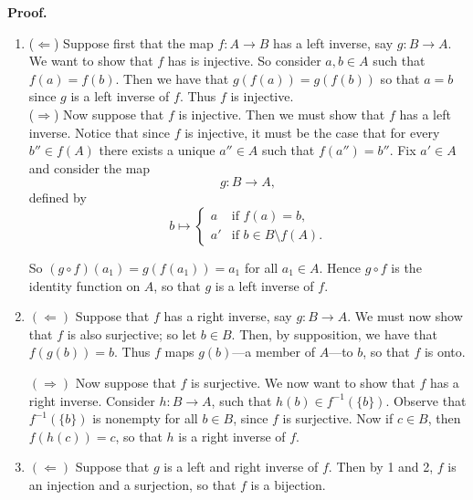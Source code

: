 \begin{enumerate}
      \textbf{Proof.}
      \begin{enumerate}
         \item ($\Leftarrow$) Suppose first that the map $f : A \rightarrow B$ 
               has a left inverse, say $g : B \rightarrow A$. We want to show 
               that $f$ has is injective. So consider $a, b \in A$ such that
               $f(a) = f(b)$. Then we have that $g(f(a)) = g(f(b))$ so that
               $a = b$ since $g$ is a left inverse of $f$. Thus $f$ is
               injective. \\
               ($\Rightarrow$) Now suppose that $f$ is injective. Then we must 
               show that $f$ has	a left inverse. Notice that since $f$ is 
               injective, it must be the case that for every $b'' \in f(A)$ 
               there exists a unique $a'' \in A$ such that $f(a'') = b''$. Fix 
               $a' \in A$ and consider the map
	            $$g : B \rightarrow A,$$
               defined by
	            \begin{equation*}
		            b \mapsto \left\{
			            \begin{array}{ll}
				            a & \text{if } f(a) = b,\\
                        a' & \text{if } b \in B\setminus f(A).
                     \end{array} \right.
               \end{equation*}
   
               So $(g \circ f)(a_1) = g(f(a_1)) = a_1$ for all $a_1 \in A$.
               Hence $g \circ f$ is the identity function on $A$, so that $g$ is
               a left inverse of $f$.

         \item $(\Leftarrow)$ Suppose that $f$ has a right inverse, say
               $g : B \rightarrow A$. We must now show that $f$ is also 
               surjective; so let $b \in B$. Then, by supposition, we have that 
               $f(g(b)) = b$. Thus $f$ maps $g(b)$---a member of $A$---to $b$, 
               so that $f$ is onto.
   
               $(\Rightarrow)$ Now suppose that $f$ is surjective. We now want 
               to show that $f$ has a right inverse. Consider
               $h : B \rightarrow A$, such that $h(b) \in f^{-1}(\{b\})$. 
               Observe that $f^{-1}(\{b\})$ is nonempty for all $b \in B$, 
               since $f$ is surjective. Now if $c \in B$, then $f(h(c)) = c$, 
               so that $h$ is a right inverse of $f$.
         \item $(\Leftarrow)$ Suppose that $g$ is a left and right inverse of
               $f$. Then by 1 and 2, $f$ is an injection and a surjection, so 
               that $f$ is a bijection.
   

\end{enumerate}
\end{enumerate}
